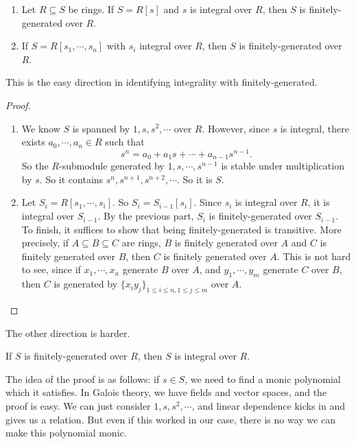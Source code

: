 \documentclass[a4paper]{article}
\begin{document}
\begin{prop}\leavevmode
  \begin{enumerate}
    \item Let $R \subseteq S$ be rings. If $S = R[s]$ and $s$ is integral over $R$, then $S$ is finitely-generated over $R$.
    \item If $S = R[s_1, \cdots, s_n]$ with $s_i$ integral over $R$, then $S$ is finitely-generated over $R$.
  \end{enumerate}
\end{prop}
This is the easy direction in identifying integrality with finitely-generated.

\begin{proof}\leavevmode
  \begin{enumerate}
    \item We know $S$ is spanned by $1, s, s^2, \cdots$ over $R$. However, since $s$ is integral, there exists $a_0, \cdots, a_n \in R$ such that
      \[
        s^n = a_0 + a_1 s + \cdots + a_{n - 1}s^{n - 1}.
      \]
      So the $R$-submodule generated by $1, s, \cdots, s^{n - 1}$ is stable under multiplication by $s$. So it contains $s^n, s^{n + 1}, s^{n + 2}, \cdots$. So it is $S$.
    \item Let $S_i = R[s_1, \cdots, s_i]$. So $S_i = S_{i - 1}[s_i]$. Since $s_i$ is integral over $R$, it is integral over $S_{i - 1}$. By the previous part, $S_i$ is finitely-generated over $S_{i - 1}$. To finish, it suffices to show that being finitely-generated is transitive. More precisely, if $A \subseteq B \subseteq C$ are rings, $B$ is finitely generated over $A$ and $C$ is finitely generated over $B$, then $C$ is finitely generated over $A$. This is not hard to see, since if $x_1, \cdots, x_n$ generate $B$ over $A$, and $y_1, \cdots, y_m$ generate $C$ over $B$, then $C$ is generated by $\{x_i y_j\}_{1 \leq i \leq n,1 \leq j \leq m}$ over $A$.
  \end{enumerate}
\end{proof}
The other direction is harder.

\begin{thm}
  If $S$ is finitely-generated over $R$, then $S$ is integral over $R$.
\end{thm}
The idea of the proof is as follows: if $s \in S$, we need to find a monic polynomial which it satisfies. In Galois theory, we have fields and vector spaces, and the proof is easy. We can just consider $1, s, s^2, \cdots$, and linear dependence kicks in and gives us a relation. But even if this worked in our case, there is no way we can make this polynomial monic.
\end{document}
